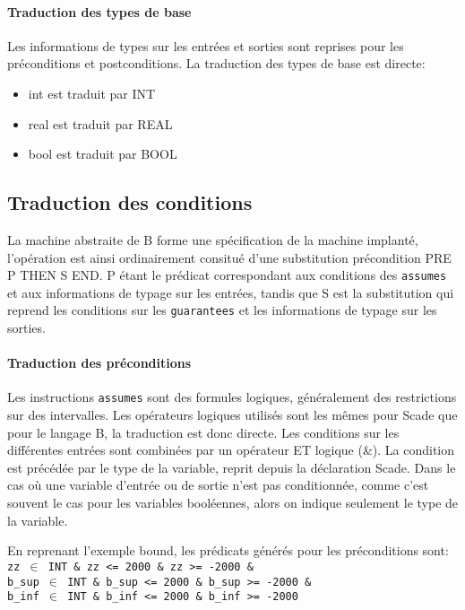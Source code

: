 \paragraph{Traduction des types de base}
Les informations de types sur les entrées et sorties sont reprises pour les
préconditions et postconditions.
La traduction des types de base est directe:
\begin{itemize}
\item int est traduit par INT
\item real est traduit par REAL
\item bool est traduit par BOOL
\end{itemize}


\subsection{Traduction des conditions}

La machine abstraite de B forme une spécification de la machine implanté,
l'opération est ainsi ordinairement consitué d'une substitution précondition
PRE P THEN S END. P étant le prédicat correspondant aux conditions des
\texttt{assumes} et aux informations de typage sur les entrées, tandis que S est
la substitution qui reprend les conditions sur les \texttt{guarantees} et les informations de typage
sur les sorties. 

\paragraph{Traduction des préconditions}
Les instructions \texttt{assumes} sont des formules logiques, généralement des
restrictions sur des intervalles. Les opérateurs logiques utilisés sont les
mêmes pour Scade que pour le langage B, la traduction est donc directe. Les
conditions sur les différentes entrées sont combinées par un opérateur ET
logique (\&). La condition est précédée par le type de la variable, reprit
depuis la déclaration Scade. 
Dans le cas où une variable d'entrée ou de sortie n'est pas conditionnée, comme
c'est souvent le cas pour les variables booléennes, alors on indique seulement
le type de la variable.

\noindent
En reprenant l'exemple bound, les prédicats générés pour les
préconditions sont:\\

\noindent
\texttt{zz $\in$ INT \& zz <= 2000 \& zz >= -2000 \& \\
b\_sup $\in$ INT \& b\_sup <= 2000 \& b\_sup >= -2000 \& \\
b\_inf $\in$ INT \& b\_inf <= 2000 \& b\_inf >= -2000 \\
}



